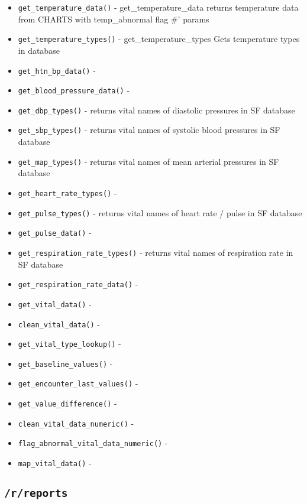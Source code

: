 \documentclass[
]{book}
\providecommand{\tightlist}{%
  \setlength{\itemsep}{0pt}\setlength{\parskip}{0pt}}
\begin{document}
\begin{itemize}
\tightlist
\item
  \texttt{get\_temperature\_data()} - get\_temperature\_data returns temperature data from CHARTS with temp\_abnormal flag \#' \citet{param} params
\item
  \texttt{get\_temperature\_types()} - get\_temperature\_types Gets temperature types in database
\item
  \texttt{get\_htn\_bp\_data()} -
\item
  \texttt{get\_blood\_pressure\_data()} -
\item
  \texttt{get\_dbp\_types()} - returns vital names of diastolic pressures in SF database
\item
  \texttt{get\_sbp\_types()} - returns vital names of systolic blood pressures in SF database
\item
  \texttt{get\_map\_types()} - returns vital names of mean arterial pressures in SF database
\item
  \texttt{get\_heart\_rate\_types()} -
\item
  \texttt{get\_pulse\_types()} - returns vital names of heart rate / pulse in SF database
\item
  \texttt{get\_pulse\_data()} -
\item
  \texttt{get\_respiration\_rate\_types()} - returns vital names of respiration rate in SF database
\item
  \texttt{get\_respiration\_rate\_data()} -
\item
  \texttt{get\_vital\_data()} -
\item
  \texttt{clean\_vital\_data()} -
\item
  \texttt{get\_vital\_type\_lookup()} -
\item
  \texttt{get\_baseline\_values()} -
\item
  \texttt{get\_encounter\_last\_values()} -
\item
  \texttt{get\_value\_difference()} -
\item
  \texttt{clean\_vital\_data\_numeric()} -
\item
  \texttt{flag\_abnormal\_vital\_data\_numeric()} -
\item
  \texttt{map\_vital\_data()} -
\end{itemize}

\hypertarget{rreports-1}{%
\subsection{\texorpdfstring{\texttt{/r/reports}}{/r/reports}}\label{rreports-1}}
\end{document}
